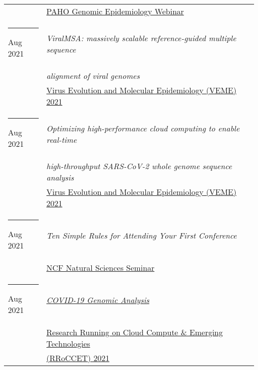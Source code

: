 \documentclass[margin,line]{res}
\begin{document}
\begin{resume}
\begin{longtable}{@{}p{0.7in}p{4in}}
\hspace*{-4mm} & \hspace{4mm} \href{https://www.paho.org/}{PAHO Genomic Epidemiology Webinar}\\
\hspace*{-4mm} \rule{-1mm}{5mm} Aug 2021 & \textit{ViralMSA: massively scalable reference-guided multiple sequence}\\*
\hspace*{-4mm} & \hspace{4mm} \textit{alignment of viral genomes}\\*
\hspace*{-4mm} & \hspace{4mm} \href{https://rega.kuleuven.be/cev/veme-workshop/2021}{Virus Evolution and Molecular Epidemiology (VEME) 2021}\\
\hspace*{-4mm} \rule{-1mm}{5mm} Aug 2021 & \textit{Optimizing high-performance cloud computing to enable real-time}\\*
\hspace*{-4mm} & \hspace{4mm} \textit{high-throughput SARS-CoV-2 whole genome sequence analysis}\\*
\hspace*{-4mm} & \hspace{4mm} \href{https://rega.kuleuven.be/cev/veme-workshop/2021}{Virus Evolution and Molecular Epidemiology (VEME) 2021}\\
\hspace*{-4mm} \rule{-1mm}{5mm} Aug 2021 & \textit{Ten Simple Rules for Attending Your First Conference}\\*
\hspace*{-4mm} & \hspace{4mm} \href{https://www.ncf.edu/academics/undergraduate-program/division-of-natural-sciences/natural-sciences/}{NCF Natural Sciences Seminar}\\
\hspace*{-4mm} \rule{-1mm}{5mm} Aug 2021 & \href{https://na.eventscloud.com/website/23042/}{\textit{COVID-19 Genomic Analysis}}\\*
\hspace*{-4mm} & \hspace{4mm} \href{https://na.eventscloud.com/website/23042/}{Research Running on Cloud Compute \& Emerging Technologies}\\*
\hspace*{-4mm} & \hspace{4mm} \href{https://na.eventscloud.com/website/23042/}{(RRoCCET) 2021}\\

\end{longtable}
\end{resume}
\end{document}
